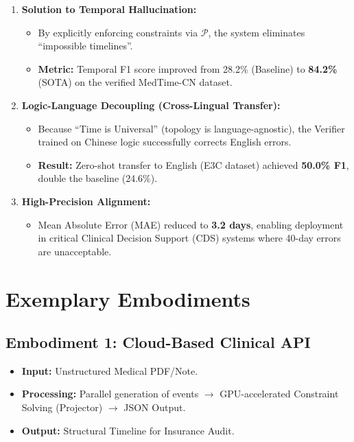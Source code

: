 \documentclass[12pt,a4paper]{article}
\begin{document}
\begin{enumerate}
    \item \textbf{Solution to Temporal Hallucination:}
    \begin{itemize}
        \item By explicitly enforcing constraints via $\mathcal{P}$, the system eliminates ``impossible timelines''.
        \item \textbf{Metric:} Temporal F1 score improved from 28.2\% (Baseline) to \textbf{84.2\%} (SOTA) on the verified MedTime-CN dataset.
    \end{itemize}

    \item \textbf{Logic-Language Decoupling (Cross-Lingual Transfer):}
    \begin{itemize}
        \item Because ``Time is Universal'' (topology is language-agnostic), the Verifier trained on Chinese logic successfully corrects English errors.
        \item \textbf{Result:} Zero-shot transfer to English (E3C dataset) achieved \textbf{50.0\% F1}, double the baseline (24.6\%).
    \end{itemize}

    \item \textbf{High-Precision Alignment:}
    \begin{itemize}
        \item Mean Absolute Error (MAE) reduced to \textbf{3.2 days}, enabling deployment in critical Clinical Decision Support (CDS) systems where 40-day errors are unacceptable.
    \end{itemize}
\end{enumerate}

\section{Exemplary Embodiments}

\subsection{Embodiment 1: Cloud-Based Clinical API}
\begin{itemize}
    \item \textbf{Input:} Unstructured Medical PDF/Note.
    \item \textbf{Processing:} Parallel generation of events $\to$ GPU-accelerated Constraint Solving (Projector) $\to$ JSON Output.
    \item \textbf{Output:} Structural Timeline for Insurance Audit.
\end{itemize}
\end{document}
